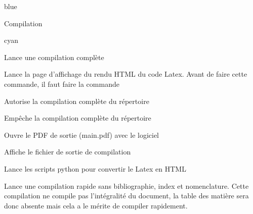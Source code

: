 \begin{items}{blue}{\Triangle}

    \item Compilation
    \begin{items}{cyan}{\Triangle}
        \item {}

        Lance une compilation complète\\ 
        \item {}

        Lance la page d'affichage du rendu HTML du code Latex. Avant de faire cette commande, il faut faire la commande \\ 
        \item  {}

        Autorise la compilation complète du répertoire \\ 
        \item  {}

        Empêche la compilation complète du répertoire \\ 
        \item  {}

        Ouvre le PDF de sortie (main.pdf) avec le logiciel \\ 
        \item  {}

        Affiche le fichier de sortie de compilation\\ 
        \item  {}

        Lance les scripts python pour convertir le Latex en HTML\\ 
        \item  {}

        Lance une compilation rapide sans bibliographie, index et nomenclature. Cette compilation ne compile pas l'intégralité du document, la table des matière sera donc absente mais cela a le mérite de compiler rapidement.\\ 
    \end{items}
\end{items}

